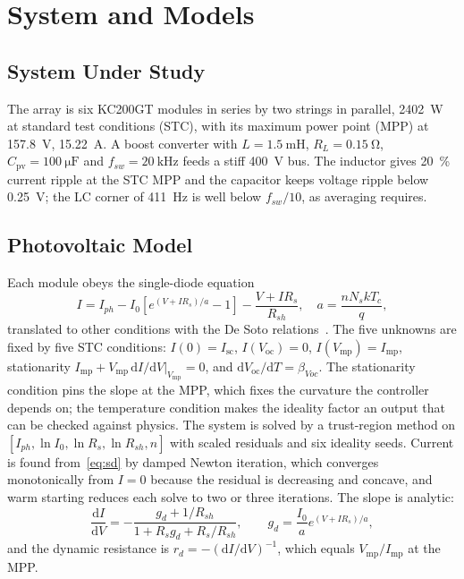 \documentclass[journal]{IEEEtran}
\newcommand{\Vmp}{V_{\mathrm{mp}}}
\newcommand{\Imp}{I_{\mathrm{mp}}}
\newcommand{\Voc}{V_{\mathrm{oc}}}
\newcommand{\Isc}{I_{\mathrm{sc}}}
\begin{document}
\section{System and Models}
\label{sec:models}

\subsection{System Under Study}
The array is six KC200GT modules in series by two strings in parallel, \SI{2402}{\watt} at standard test
conditions (STC), with its maximum power point (MPP) at \SI{157.8}{\volt}, \SI{15.22}{\ampere}. A boost
converter with $L=\SI{1.5}{\milli\henry}$, $R_L=\SI{0.15}{\ohm}$, $C_{\mathrm{pv}}=\SI{100}{\micro\farad}$
and $f_{sw}=\SI{20}{\kilo\hertz}$ feeds a stiff \SI{400}{\volt} bus. The inductor gives \SI{20}{\percent}
current ripple at the STC MPP and the capacitor keeps voltage ripple below \SI{0.25}{\volt}; the LC corner of
\SI{411}{\hertz} is well below $f_{sw}/10$, as averaging requires.

\subsection{Photovoltaic Model}
\label{sec:pv}
Each module obeys the single-diode equation
\begin{equation}
I = I_{ph} - I_0\!\left[e^{(V + I R_s)/a} - 1\right] - \frac{V + I R_s}{R_{sh}},\quad a = \frac{n N_s k T_c}{q},
\label{eq:sd}
\end{equation}
translated to other conditions with the De Soto relations~\cite{desoto}. The five unknowns are fixed by
five STC conditions: $I(0)=\Isc$, $I(\Voc)=0$, $I(\Vmp)=\Imp$, stationarity
$\Imp + \Vmp\,\mathrm{d}I/\mathrm{d}V|_{\Vmp}=0$, and $\mathrm{d}\Voc/\mathrm{d}T=\beta_{Voc}$. The
stationarity condition pins the slope at the MPP, which fixes the curvature the controller depends on; the
temperature condition makes the ideality factor an output that can be checked against physics. The system is
solved by a trust-region method on $[I_{ph},\ln I_0,\ln R_s,\ln R_{sh},n]$ with scaled residuals and six
ideality seeds. Current is found from~\eqref{eq:sd} by damped Newton iteration, which converges
monotonically from $I=0$ because the residual is decreasing and concave, and warm starting reduces each solve
to two or three iterations. The slope is analytic:
\begin{equation}
\frac{\mathrm{d}I}{\mathrm{d}V} = -\frac{g_d + 1/R_{sh}}{1 + R_s g_d + R_s/R_{sh}},\qquad
g_d = \frac{I_0}{a}e^{(V+IR_s)/a},
\label{eq:didv}
\end{equation}
and the dynamic resistance is $r_d = -(\mathrm{d}I/\mathrm{d}V)^{-1}$, which equals $\Vmp/\Imp$ at the MPP.
\end{document}
